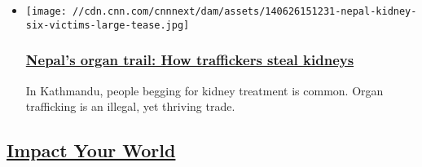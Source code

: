 \begin{itemize}
\item
  \href{/2014/06/26/world/asia/freedom-project-nepals-organ-trail/index.html}{}

  \texttt{[image: //cdn.cnn.com/cnnnext/dam/assets/140626151231-nepal-kidney-six-victims-large-tease.jpg]}

  \hypertarget{nepals-organ-trail-how-traffickers-steal-kidneys}{%
  \subsubsection{\texorpdfstring{\href{/2014/06/26/world/asia/freedom-project-nepals-organ-trail/index.html}{Nepal's
  organ trail: How traffickers steal
  kidneys}}{Nepal's organ trail: How traffickers steal kidneys}}\label{nepals-organ-trail-how-traffickers-steal-kidneys}}

  In Kathmandu, people begging for kidney treatment is common. Organ
  trafficking is an illegal, yet thriving trade.
\end{itemize}

\hypertarget{impact-your-world-}{%
\subsection{\texorpdfstring{\href{http://www.edition.cnn.com/specials/impact-your-world}{Impact
Your World}~}{Impact Your World~}}\label{impact-your-world-}}

